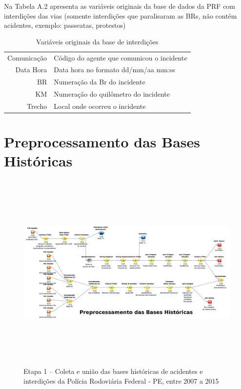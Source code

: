Na Tabela A.2 apresenta as variáveis originais da base de dados da PRF com interdições das vias 
(somente interdições que paralisaram as BRs, não contém acidentes, exemplo: passeatas, protestos) 

\begin{table}[htbp]
 \centering
  \caption{Variáveis originais da base de interdições}
  
  \begin{tabular}{r|l} \hline
   Comunicação & Código do agente que comunicou o incidente \\
   Data Hora & Data hora no formato dd/mm/aa mm:ss \\
   BR & Numeração da Br do incidente\\
   KM & Numeração do quilômetro do incidente\\
   Trecho  & Local onde ocorreu o incidente \\
  \end{tabular}
\end{table}


\pagebreak


\section{Preprocessamento das Bases Históricas}\label{intro:Anexo}

\begin{figure}[ht]
  \centering
    \caption{Etapa 1  -- Coleta e união das bases históricas de acidentes e interdições da Polícia Rodoviária Federal - PE, entre 2007 a 2015}
    \includegraphics[width=165mm, height=100mm]{Figuras/Cronograma/BasesHistoricas.png}
\end{figure}

